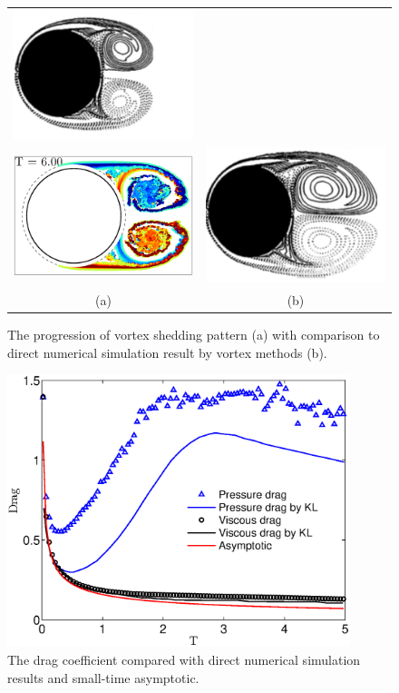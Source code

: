 \begin{figure}
\begin{center}
\begin{tabular}{cc}
 \includegraphics[width=6cm]{./Figures/KOU_Re1000_T4.png}  \\
 \includegraphics[width=6cm]{./Figures/vortices_T6_00.eps}  &
 \includegraphics[width=6cm]{./Figures/KOU_Re1000_T6.png}  \\
 (a) & (b) \\
 \end{tabular}
\end{center}
 \caption[Vortex shedding pattern in the wake]{The progression of vortex shedding pattern (a) with comparison to direct numerical simulation result by vortex methods (b). }
 \label{fig:wake}
\end{figure}


\begin{figure}
\begin{center}
\includegraphics[width=10cm]{./Figures/Drag.eps}
\end{center}
\caption[Drag coefficient]{The drag coefficient compared with direct numerical simulation results and small-time asymptotic.}
\label{fig:Drag}
\end{figure}


